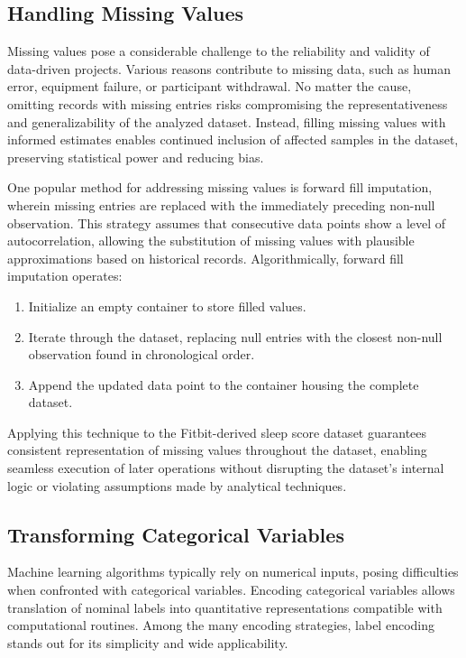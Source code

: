 \documentclass[10pt]{extarticle}
\begin{document}
\subsection{Handling Missing Values}

Missing values pose a considerable challenge to the reliability and validity of data-driven projects. Various reasons contribute to missing data, such as human error, equipment failure, or participant withdrawal. No matter the cause, omitting records with missing entries risks compromising the representativeness and generalizability of the analyzed dataset. Instead, filling missing values with informed estimates enables continued inclusion of affected samples in the dataset, preserving statistical power and reducing bias.

One popular method for addressing missing values is forward fill imputation, wherein missing entries are replaced with the immediately preceding non-null observation. This strategy assumes that consecutive data points show a level of autocorrelation, allowing the substitution of missing values with plausible approximations based on historical records. Algorithmically, forward fill imputation operates:

\begin{enumerate}
\item Initialize an empty container to store filled values.
\item Iterate through the dataset, replacing null entries with the closest non-null observation found in chronological order.
\item Append the updated data point to the container housing the complete dataset.
\end{enumerate}

Applying this technique to the Fitbit-derived sleep score dataset guarantees consistent representation of missing values throughout the dataset, enabling seamless execution of later operations without disrupting the dataset's internal logic or violating assumptions made by analytical techniques.

\subsection{Transforming Categorical Variables}

Machine learning algorithms typically rely on numerical inputs, posing difficulties when confronted with categorical variables. Encoding categorical variables allows translation of nominal labels into quantitative representations compatible with computational routines. Among the many encoding strategies, label encoding stands out for its simplicity and wide applicability.
\end{document}
